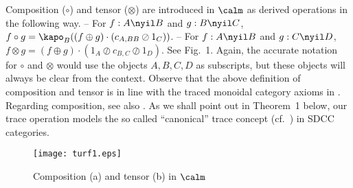 \documentclass{eptcs}
\begin{document}
Composition ($\circ $) and tensor ($\otimes $) are introduced in $\calm $
as derived operations in the following way.      
\vsp\newline
  -- For $f:A\nyil B$ and $g:B\nyil C$, $f\circ g=\kapo _B((f\oplus g)\cdot 
    (c_{A,BB}\oslash 1_C))$. 
\newline
  -- For $f:A\nyil B$ and $g:C\nyil D$, $f\otimes g=(f\oplus g)\cdot (1_A\oslash 
     c_{B,C}\oslash 1_D)$.
\vsp\newline
See Fig.\ 1. Again, the accurate notation for $\circ $ and $\otimes $ would use the 
objects $A,B,C,D$ as subscripts, but these objects will always be clear 
from the context. Observe that the above definition of composition and tensor
is in line with the traced monoidal category axioms in \cite{tra,concur}. 
Regarding composition, see also \cite[Identity $X_3$]{acta}. As we shall point out
in Theorem~1 below, our trace operation models the so called 
``canonical'' trace concept (cf.\ \cite{tra}) in SDCC categories. 
\begin{figure}[h]
\begin{center}
\texttt{[image: turf1.eps]}
\end{center}
\vspmm
\caption{Composition (a) and tensor (b) in $\calm $}
\vspmmm \vspmini
\end{figure}
\end{document}
